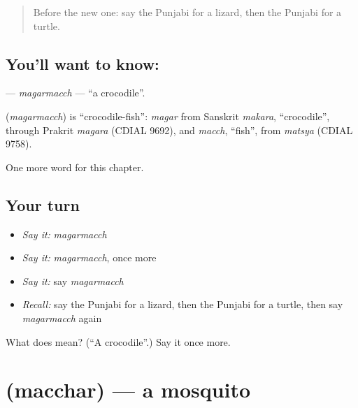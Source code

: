 \label{lesson:PA-C131-magarmacch}



\begin{quote}
Before the new one: say the Punjabi for a lizard, then the Punjabi for a turtle.
\end{quote}

\subsection*{You'll want to know: }
\textbf{} — \emph{magarmacch} — \textquotedblleft{}a crocodile\textquotedblright{}.

\begin{cousinweb}
\textbf{} (\emph{magarmacch}) is \textquotedblleft{}crocodile-fish\textquotedblright{}: \emph{magar} from Sanskrit \emph{makara}, \textquotedblleft{}crocodile\textquotedblright{}, through Prakrit \emph{magara} (CDIAL 9692), and \emph{macch}, \textquotedblleft{}fish\textquotedblright{}, from \emph{matsya} (CDIAL 9758).
\end{cousinweb}

\begin{grammarlens}[title={What you've built}]
One more word for this chapter.
\end{grammarlens}

\subsection*{Your turn}
\begin{itemize}
\raggedright
  \item \emph{Say it:} \emph{magarmacch}
  \item \emph{Say it:} \emph{magarmacch}, once more
  \item \emph{Say it:} say \emph{magarmacch}
  \item \emph{Recall:} say the Punjabi for a lizard, then the Punjabi for a turtle, then say \emph{magarmacch} again
\end{itemize}

\begin{tcolorbox}[breakable,colback=teal!4,colframe=teal!35!black,title={Before you move on}]
What does  mean? (\textquotedblleft{}A crocodile\textquotedblright{}.) Say it once more.
\end{tcolorbox}
\section[\texorpdfstring{\pa{ਮੱਛਰ} (macchar)}{ਮੱਛਰ (macchar)}]{ (macchar) — a mosquito}

